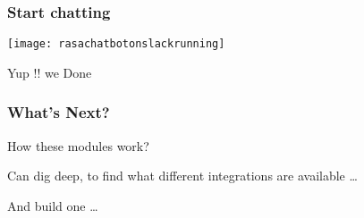 



\begin{frame}[fragile]\frametitle{Start chatting }

\begin{center}
\texttt{[image: rasachatbotonslackrunning]}%
\end{center}

Yup !! we Done
\end{frame}

\begin{frame}[fragile]\frametitle{What's Next?}
How these modules work? 

Can dig deep, to find what different integrations are available \ldots

And build one \ldots

\end{frame}
